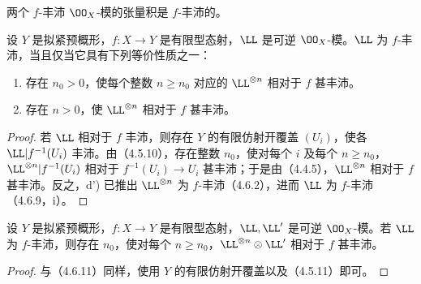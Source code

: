 两个 $f$-丰沛 $\OO_X$-模的张量积是 $f$-丰沛的。

设 $Y$ 是拟紧预概形，$f:X\to Y$ 是有限型态射，$\LL$ 是可逆 $\OO_X$-模。$\LL$ 为 $f$-丰沛，当且仅当它具有下列等价性质之一：
\begin{enumerate}[label=\textup{d)}]
\item 存在 $n_0>0$，使每个整数 $n\geq n_0$ 对应的 $\LL^{\otimes n}$ 相对于 $f$ 甚丰沛。
\item[\textup{d')}] 存在 $n>0$，使 $\LL^{\otimes n}$ 相对于 $f$ 甚丰沛。
\end{enumerate}
\begin{proof}
若 $\LL$ 相对于 $f$ 丰沛，则存在 $Y$ 的有限仿射开覆盖 $(U_i)$，使各 $\LL|f^{-1}(U_i)$ 丰沛。由（4.5.10），存在整数 $n_0$，使对每个 $i$ 及每个 $n\geq n_0$，$\LL^{\otimes n}|f^{-1}(U_i)$ 相对于 $f^{-1}(U_i)\to U_i$ 甚丰沛；于是由（4.4.5），$\LL^{\otimes n}$ 相对于 $f$ 甚丰沛。反之，d') 已推出 $\LL^{\otimes n}$ 为 $f$-丰沛（4.6.2），进而 $\LL$ 为 $f$-丰沛（4.6.9，i）。
\end{proof}

设 $Y$ 是拟紧预概形，$f:X\to Y$ 是有限型态射，$\LL,\LL'$ 是可逆 $\OO_X$-模。若 $\LL$ 为 $f$-丰沛，则存在 $n_0$，使对每个 $n\geq n_0$，$\LL^{\otimes n}\otimes\LL'$ 相对于 $f$ 甚丰沛。
\begin{proof}
与（4.6.11）同样，使用 $Y$ 的有限仿射开覆盖以及（4.5.11）即可。
\end{proof}

